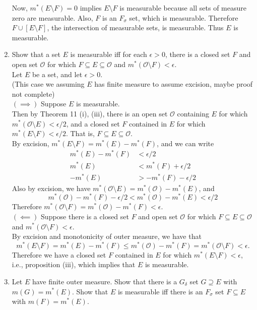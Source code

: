 \begin{enumerate}
	Now, $m^*(E\setminus F)=0$ implies $E\setminus F$ is measurable because all sets of measure zero are measurable.
	Also, $F$ is an $F_\sigma$ set, which is measurable. Therefore $F\cup [E\setminus F]$, the intersection of measurable sets, is measurable.
	Thus $E$ is measurable.
	\item Show that a set $E$ is measurable iff for each $\epsilon>0$, there is a closed set $F$ and open set $\mathcal{O}$ for which $F\subseteq E\subseteq \mathcal{O}$ and $m^*(\mathcal{O}\setminus F)<\epsilon$.\\
	Let $E$ be a set, and let $\epsilon>0$.\\
	(This case we assuming $E$ has finite measure to assume excision, maybe proof not complete)\\
	$(\implies)$ Suppose $E$ is measurable.\\
	Then by Theorem 11 (i), (iii), there is an open set $\mathcal{O}$ containing $E$ for which $m^*(\mathcal{O}\setminus E)<\epsilon/2$, and a closed set $F$ contained in $E$ for which $m^*(E\setminus F)<\epsilon/2$.
	That is, $F\subseteq E\subseteq \mathcal{O}$.\\
	By excision, $m^*(E\setminus F)=m^*(E)-m^*(F)$, and we can write
	\begin{align*}
		m^*(E)-m^*(F)&<\epsilon/2\\
		m^*(E)&<m^*(F)+\epsilon/2\\
		-m^*(E)&>-m^*(F)-\epsilon/2
	\end{align*}
	Also by excision, we have  $m^*(\mathcal{O}\setminus E)=m^*(\mathcal{O})-m^*(E)$, and 
	\[
		m^*(\mathcal{O})-m^*(F)-\epsilon/2<m^*(\mathcal{O})-m^*(E)<\epsilon/2
	\]
	Therefore $m^*(\mathcal{O}\setminus F)=m^*(\mathcal{O})-m^*(F)<\epsilon$.\\
	$(\impliedby)$ Suppose there is a closed set $F$ and open set $\mathcal{O}$ for which $F\subseteq E\subseteq \mathcal{O}$ and $m^*(\mathcal{O}\setminus F)<\epsilon$.\\
	By excision and monotonicity of outer measure, we have that 
	\[
		m^*(E\setminus F)=m^*(E)-m^*(F)\le m^*(\mathcal{O})-m^*(F)=m^*(\mathcal{O}\setminus F)<\epsilon.
	\]
	Therefore we have a closed set $F$ contained in $E$ for which $m^*(E\setminus F)<\epsilon$, i.e., proposition (iii), which implies that $E$ is measurable.
	\item Let $E$ have finite outer measure. Show that there is a $G_\delta$ set $G\supseteq E$ with $m(G)=m^*(E)$.
	Show that $E$ is measurable iff there is an $F_\sigma$ set $F \subseteq E$ with $m(F)=m^*(E)$.\\

\end{enumerate}
